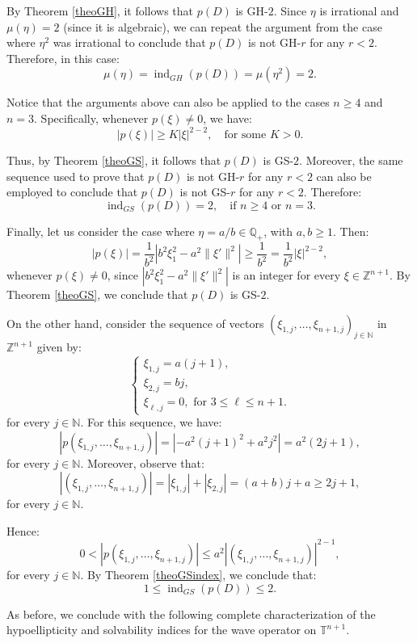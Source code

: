 \documentclass[11pt]{amsart}
\numberwithin{equation}{section}
\theoremstyle{definition}
\begin{document}
	By Theorem \ref{theoGH}, it follows that $p(D)$ is GH-$2$. Since $\eta$ is irrational and $\mu(\eta)=2$ (since it is algebraic), we can repeat the argument from the case where $\eta^2$ was irrational to conclude that $p(D)$ is not GH-$r$ for any $r < 2$. Therefore, in this case:
	\[
	\mu(\eta)=\operatorname{ind}_{GH}(p(D)) = \mu(\eta^2)=2.
	\]

	Notice that the arguments above can also be applied to the cases $n \geq 4$ and $n = 3$. Specifically, whenever $p(\xi) \neq 0$, we have:
	\[
	|p(\xi)| \geq K |\xi|^{2-2}, \quad \text{for some } K > 0.
	\]
	
	Thus, by Theorem \ref{theoGS}, it follows that $p(D)$ is GS-$2$. Moreover, the same sequence used to prove that $p(D)$ is not GH-$r$ for any $r < 2$ can also be employed to conclude that $p(D)$ is not GS-$r$ for any $r < 2$. Therefore:
	\[
	\operatorname{ind}_{GS}(p(D)) = 2, \quad \text{if } n \geq 4 \text{ or } n = 3.
	\]
	
	Finally, let us consider the case where $\eta = a/b \in \mathbb{Q}_+$, with $a, b \geq 1$. Then:
	\[
	|p(\xi)| = \frac{1}{b^2} |b^2 \xi_1^2 - a^2 \|\xi'\|^2| \geq \frac{1}{b^2} = \frac{1}{b^2} |\xi|^{2-2},
	\]
	whenever $p(\xi) \neq 0$, since $|b^2 \xi_1^2 - a^2 \|\xi'\|^2|$ is an integer for every $\xi \in \mathbb{Z}^{n+1}$. By Theorem \ref{theoGS}, we conclude that $p(D)$ is GS-$2$.
	
	On the other hand, consider the sequence of vectors $(\xi_{1, j},\ldots, \xi_{n+1, j} )_{j \in \mathbb{N}}$ in \( \mathbb{Z}^{n+1}\) given by:
	\[
	\begin{cases}
		\xi_{1,j} = a(j+1), \\
		\xi_{2,j} = bj, \\
		\xi_{\ell,j} = 0, \text{ for } 3 \leq \ell \leq n+1.
	\end{cases}
	\]
	for every $j \in \mathbb{N}$. For this sequence, we have:
	\[
	|p(\xi_{1, j},\ldots, \xi_{n+1, j}) | = |-a^2 (j+1)^2 + a^2 j^2| = a^2(2j+1),
	\]
	for every $j \in \mathbb{N}$. Moreover, observe that:
	\[
	|(\xi_{1, j},\ldots, \xi_{n+1, j})| = |\xi_{1,j}| + |\xi_{2,j}| = (a+b)j + a \geq 2j+1,
	\]
	for every $j \in \mathbb{N}$. 
	
	Hence:
	\[
	0 < |p(\xi_{1, j},\ldots, \xi_{n+1, j})| \leq a^2 |(\xi_{1, j},\ldots, \xi_{n+1, j})|^{2-1},
	\]
	for every $j \in \mathbb{N}$. By Theorem \ref{theoGSindex}, we conclude that:
	\[
	1 \leq \operatorname{ind}_{GS}(p(D)) \leq 2.
	\]

		
	As before, we conclude with the following complete characterization of the hypoellipticity and solvability indices for the wave operator on $\mathbb{T}^{n+1}$.
\end{document}
